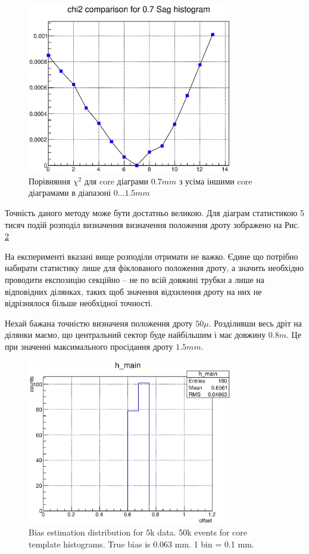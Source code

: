 \documentclass[]{article}
\begin{document}
	\begin{figure}
	\centering
	\includegraphics[width=0.8\textwidth]{chi2_07}
	\caption{ Порівняння $\chi^2$ для core діаграми $0.7 mm$ з усіма іншими core діаграмами в діапазоні $0\dots 1.5 mm$}
	\label{fig:chi2for07}	
	\end{figure}
	
	Точність даного методу може бути достатньо великою. Для діаграм статистикою 5 тисяч подій розподіл визначення визначення положення дроту зображено на Рис. \ref{fig:chi_063_5k}
	
	На експерименті вказані вище розподіли отримати не важко. Єдине що потрібно набирати статистику лише для фіклованого положення дроту, а значить необхідно проводити експозицію секційно -- не по всій довжині трубки а лише на відповідних ділянках, таких щоб значення відхилення дроту на них не відрізнялося більше необхідної точності.
	
	Нехай бажана точністю визначеня положення дроту $50 \mu$. Розділивши весь дріт на ділянки маємо, що центральний сектор буде найбільшим і має довжину $0.8 m$. Це при значенні максимального просідання дроту $1.5 mm$.
	
	
	\begin{figure}[h]
	\includegraphics[width=0.8\textwidth]{chi_063_5k.eps}
	\centering
	\caption{ Bias estimation distribution for 5k data. 50k events for core template histograms. True bias is 0.063 mm. 1 bin = 0.1 mm. } 
	\label{fig:chi_063_5k}
	\end{figure}
	
\end{document}
